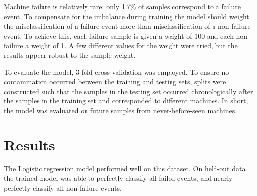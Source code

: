 \documentclass{article}
\begin{document}
Machine failure is relatively rare: only 1.7\% of samples correspond to a failure event. To compensate for the imbalance during training the model should weight the misclassification of a failure event more than misclassification of a non-failure event. To achieve this, each failure sample is given a weight of 100 and each non-failure a weight of 1. A few different values for the weight were tried, but the results appear robust to the sample weight.

To evaluate the model, 3-fold cross validation was employed. To ensure no contamination occurred between the training and testing sets, splits were constructed such that the samples in the testing set occurred chronologically after the samples in the training set and corresponded to different machines. In short, the model was evaluated on future samples from never-before-seen machines.

\section{Results}

The Logistic regression model performed well on this dataset. On held-out data the trained model was able to perfectly classify all failed events, and nearly perfectly classify all non-failure events.
\end{document}
